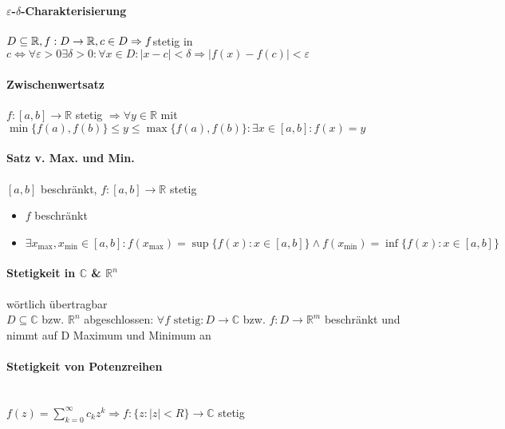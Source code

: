 \documentclass[paper=a3,paper=landscape, fontsize=9pt, DIV=30]{scrartcl}
\newcommand{\real}{{\mathbb{R}}}
\newcommand{\compl}{\mathbb{C}}
\begin{document}
\begin{multicols*}{4}
  \paragraph{$\varepsilon$-$\delta$-Charakterisierung}
  $D \subseteq \real, f: D \rightarrow \real, c \in D \Rightarrow\\f$stetig in $c \Leftrightarrow \forall \varepsilon > 0 \exists \delta > 0: \forall x \in D: \lvert x - c \rvert < \delta \Rightarrow \lvert f(x)-f(c)\rvert < \varepsilon$


  \paragraph{Zwischenwertsatz}
  $f:[a,b] \rightarrow \real$ stetig $\Rightarrow \forall y \in \real$ mit $ \min\{f(a),f(b)\} \leq y \leq \max\{f(a), f(b)\}: \exists x \in [a,b]: f(x)=y$


  \paragraph{Satz v. Max. und Min.}
  $[a,b]$ beschränkt, $f: [a,b] \rightarrow \real$ stetig
  \begin{itemize}
  \item $f$ beschränkt
  \item $\exists x_{\max}, x_{\min} \in [a,b]: f(x_{\max})=\sup\{f(x): x \in [a,b]\} \wedge f(x_{\min})=\inf\{f(x):x \in [a,b]\}$
  \end{itemize}

  \paragraph{Stetigkeit in $\compl$ \& $\real ^n$} wörtlich übertragbar\\
  $D \subseteq \compl$ bzw. $\real^n$ abgeschlossen: $\forall f \text{ stetig}: D \rightarrow \compl$ bzw. $f: D \rightarrow \real^m$ beschränkt und nimmt auf D Maximum und Minimum an

  \paragraph{Stetigkeit von Potenzreihen}\hspace{0pt}\\
  $ f(z)=\sum_{k=0}^{\infty} c_kz^k \Rightarrow f: \{z: \lvert z \rvert < R \} \rightarrow \compl$ stetig



\end{multicols*}
\end{document}
